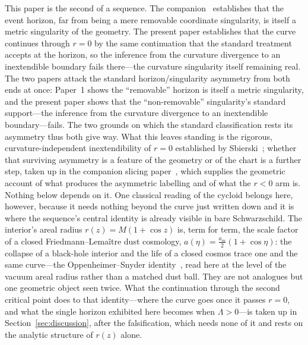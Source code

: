 \documentclass[11pt,a4paper]{article}
\theoremstyle{definition}
\begin{document}
This paper is the second of a sequence. The companion~\cite{JanzenBHcausality} establishes that the event horizon, far from being a mere removable coordinate singularity, is itself a metric singularity of the geometry. The present paper establishes that the curve continues through $r=0$ by the same continuation that the standard treatment accepts at the horizon, so the inference from the curvature divergence to an inextendible boundary fails there---the curvature singularity itself remaining real. The two papers attack the standard horizon/singularity asymmetry from both ends at once: Paper~1 shows the ``removable'' horizon is itself a metric singularity, and the present paper shows that the ``non-removable'' singularity's standard support---the inference from the curvature divergence to an inextendible boundary---fails. The two grounds on which the standard classification rests its asymmetry thus both give way. What this leaves standing is the rigorous, curvature-independent inextendibility of $r=0$ established by Sbierski~\cite{sbierski2018}; whether that surviving asymmetry is a feature of the geometry or of the chart is a further step, taken up in the companion slicing paper~\cite{JanzenSlicing}, which supplies the geometric account of what produces the asymmetric labelling and of what the $r<0$ arm is. Nothing below depends on it. One classical reading of the cycloid belongs here, however, because it needs nothing beyond the curve just written down and it is where the sequence's central identity is already visible in bare Schwarzschild. The interior's areal radius $r(z)=M(1+\cos z)$ is, term for term, the scale factor of a closed Friedmann--Lema\^itre dust cosmology, $a(\eta)=\tfrac{a_{m}}{2}(1+\cos\eta)$: the collapse of a black-hole interior and the life of a closed cosmos trace one and the same curve---the Oppenheimer--Snyder identity~\cite{Oppenheimer1939b}, read here at the level of the vacuum areal radius rather than a matched dust ball. They are not analogues but one geometric object seen twice. What the continuation through the second critical point does to that identity---where the curve goes once it passes $r=0$, and what the single horizon exhibited here becomes when $\Lambda>0$---is taken up in Section~\ref{sec:discussion}, after the falsification, which needs none of it and rests on the analytic structure of $r(z)$ alone.
\end{document}
